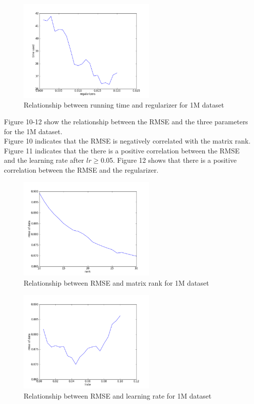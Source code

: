 \documentclass[12pt]{article}
\begin{document}
\begin{figure}[H]
\centering
\includegraphics[width=0.60\textwidth]{graphs/bigtimereg.png}
\caption{Relationship between running time and regularizer for 1M dataset}
\end{figure}

\noindent Figure 10-12 show the relationship between the RMSE and the three parameters
for the 1M dataset. \\

\noindent Figure 10 indicates that the RMSE is negatively correlated
with the matrix rank. Figure 11 indicates that the there is a positive correlation
between the RMSE and the learning rate after $lr\geq$0.05. Figure 12 shows that there is a positive correlation between the RMSE and the regularizer.

\begin{figure}[H]
\centering
\includegraphics[width=0.60\textwidth]{graphs/bigrmserank.png}
\caption{Relationship between RMSE and matrix rank for 1M dataset}
\end{figure}

\begin{figure}[H]
\centering
\includegraphics[width=0.60\textwidth]{graphs/bigrmselr.png}
\caption{Relationship between RMSE and learning rate for 1M dataset}
\end{figure}
\end{document}
